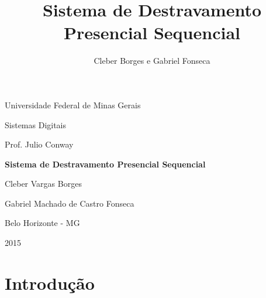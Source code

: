 \documentclass[12pt,a4paper]{report}
\author{Cleber Borges e Gabriel Fonseca}
\title{Sistema de Destravamento Presencial Sequencial}
\begin{document}
\thispagestyle{empty}
\begin{center}
{\Large\sc Universidade Federal de Minas Gerais}

{\large Sistemas Digitais}

Prof. Julio Conway

\vfill
{\LARGE\bf Sistema de Destravamento Presencial Sequencial}

\medskip
Cleber Vargas Borges

Gabriel Machado de Castro Fonseca

\vfill
Belo Horizonte - MG

2015
\end{center}
\newpage

\chapter{Introdução}
\end{document}
